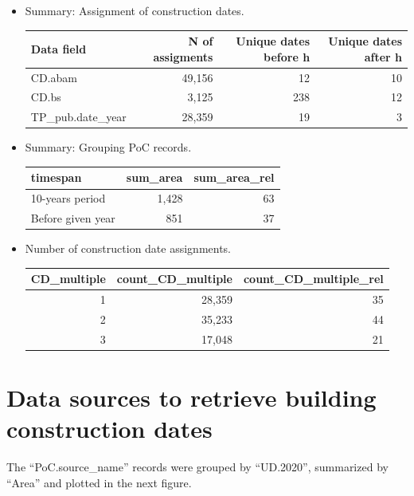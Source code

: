 \documentclass[
]{article}
\providecommand{\tightlist}{%
  \setlength{\itemsep}{0pt}\setlength{\parskip}{0pt}}
\begin{document}
\begin{itemize}
\tightlist
\item
  Summary: Assignment of construction dates.

  \begin{tabular}[t]{l|r|r|r}
  \hline
  Data field & N of assigments & Unique dates before h & Unique dates after h\\
  \hline
  CD.abam & 49,156 & 12 & 10\\
  \hline
  CD.bs & 3,125 & 238 & 12\\
  \hline
  TP\_pub.date\_year & 28,359 & 19 & 3\\
  \hline
  \end{tabular}
\item
  Summary: Grouping PoC records.

  \begin{tabular}[t]{l|r|r}
  \hline
  timespan & sum\_area & sum\_area\_rel\\
  \hline
  10-years period & 1,428 & 63\\
  \hline
  Before given year & 851 & 37\\
  \hline
  \end{tabular}
\item
  Number of construction date assignments.

  \begin{tabular}[t]{r|r|r}
  \hline
  CD\_multiple & count\_CD\_multiple & count\_CD\_multiple\_rel\\
  \hline
  1 & 28,359 & 35\\
  \hline
  2 & 35,233 & 44\\
  \hline
  3 & 17,048 & 21\\
  \hline
  \end{tabular}
\end{itemize}

\hypertarget{data-sources-to-retrieve-building-construction-dates}{%
\section{Data sources to retrieve building construction
dates}\label{data-sources-to-retrieve-building-construction-dates}}

The ``PoC.source\_name'' records were grouped by ``UD.2020'', summarized
by ``Area'' and plotted in the next figure.
\end{document}
